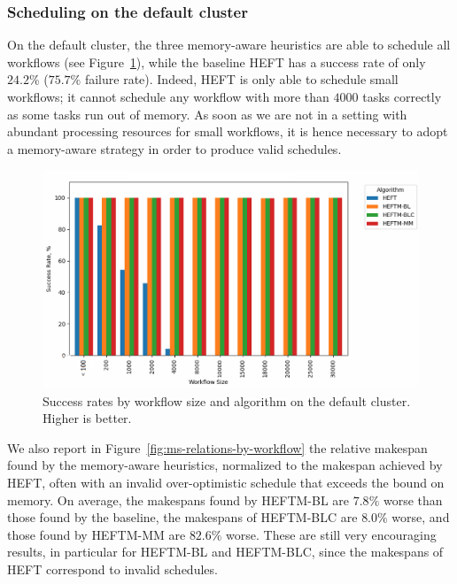 \documentclass[conference]{IEEEtran}
\newcommand{\algo}[1]{\textsc{#1}}
\newcommand{\heft}{\algo{HEFT}\xspace}
\newcommand{\heftmm}{\algo{HEFTM-MM}\xspace}
\newcommand{\heftbl}{\algo{HEFTM-BL}\xspace}
\newcommand{\heftblc}{\algo{HEFTM-BLC}\xspace}
\newcommand{\new}[1]{{\color{blue}#1}}
\begin{document}
\subsubsection{Scheduling on the default cluster}
%
%
On the default cluster,  the three memory-aware heuristics are able to schedule all workflows
(see Figure~\ref{fig:success-rates-large}), while
the baseline \heft has a success rate of only $24.2\%$ ($75.7\%$ failure rate).
Indeed, \heft is only able to schedule small workflows; it cannot schedule any workflow 
with more than $4000$ tasks correctly as some tasks run out of memory. As soon as we are not in a setting
with abundant processing resources for small workflows, it is hence necessary to adopt
a memory-aware strategy in order to produce valid schedules.

\begin{figure}[tb]
  \centering
  \includegraphics[width=1.08\columnwidth] {images/success-rates-large2}
  \vspace{-0.8cm}
  \caption{Success rates \new{by workflow size and algorithm} on the default cluster. Higher is better.}
  \label{fig:success-rates-large}
  \vspace{-0.15cm}
\end{figure}

We also report in  Figure~\ref{fig:ms-relations-by-workflow} the relative makespan found
by the memory-aware heuristics, normalized to the
makespan achieved by \heft, often with an invalid over-optimistic schedule that exceeds
the bound on memory.
On average, the makespans found by \heftbl are $7.8\%$ worse than those found by the baseline,
the makespans of \heftblc are $8.0\%$
worse, and those found by \heftmm are $82.6\%$ worse. These are still very encouraging results,
in particular for \heftbl and \heftblc, since the makespans of \heft correspond to invalid schedules.
\end{document}
